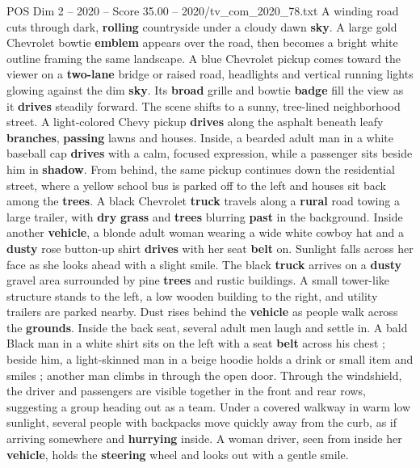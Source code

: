 \begin{textsample}{POS Dim 2 – 2020 – Score 35.00 – 2020/tv\_com\_2020\_78.txt}  \label{ex:f2_pos_041}
A winding road cuts through dark, \textbf{rolling} countryside under a cloudy dawn \textbf{sky}.
A large gold Chevrolet bowtie \textbf{emblem} appears over the road, then becomes a bright white outline framing the same landscape.
A blue Chevrolet pickup comes toward the viewer on a \textbf{two-lane} bridge or raised road, headlights and vertical running lights glowing against the dim \textbf{sky}.
Its \textbf{broad} grille and bowtie \textbf{badge} fill the view as it \textbf{drives} steadily forward.
The scene shifts to a sunny, tree-lined neighborhood street.
A light-colored Chevy pickup \textbf{drives} along the asphalt beneath leafy \textbf{branches}, \textbf{passing} lawns and houses.
Inside, a bearded adult man in a white baseball cap \textbf{drives} with a calm, focused expression, while a passenger sits beside him in \textbf{shadow}.
From behind, the same pickup continues down the residential street, where a yellow school bus is parked off to the left and houses sit back among the \textbf{trees}.
A black Chevrolet \textbf{truck} travels along a \textbf{rural} road towing a large trailer, with \textbf{dry} \textbf{grass} and \textbf{trees} blurring \textbf{past} in the background.
Inside another \textbf{vehicle}, a blonde adult woman wearing a wide white cowboy hat and a \textbf{dusty} rose button-up shirt \textbf{drives} with her seat \textbf{belt} on.
Sunlight falls across her face as she looks ahead with a slight smile.
The black \textbf{truck} arrives on a \textbf{dusty} gravel area surrounded by pine \textbf{trees} and rustic buildings.
A small tower-like structure stands to the left, a low wooden building to the right, and utility trailers are parked nearby.
Dust rises behind the \textbf{vehicle} as people walk across the \textbf{grounds}.
Inside the back seat, several adult men laugh and settle in.
A bald Black man in a white shirt sits on the left with a seat \textbf{belt} across his chest ; beside him, a light-skinned man in a beige hoodie holds a drink or small item and smiles ; another man climbs in through the open door.
Through the windshield, the driver and passengers are visible together in the front and rear rows, suggesting a group heading out as a team.
Under a covered walkway in warm low sunlight, several people with backpacks move quickly away from the curb, as if arriving somewhere and \textbf{hurrying} inside.
A woman driver, seen from inside her \textbf{vehicle}, holds the \textbf{steering} wheel and looks out with a gentle smile.

\end{textsample}
